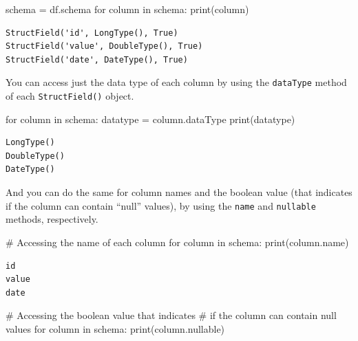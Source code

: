 \documentclass[
  11pt,
  letterpaper,
  DIV=11,
  numbers=noendperiod]{scrreprt}
\newenvironment{Shaded}{\begin{snugshade}}{\end{snugshade}}
\newcommand{\BuiltInTok}[1]{\textcolor[rgb]{0.00,0.23,0.31}{#1}}
\newcommand{\CommentTok}[1]{\textcolor[rgb]{0.37,0.37,0.37}{#1}}
\newcommand{\ControlFlowTok}[1]{\textcolor[rgb]{0.00,0.23,0.31}{#1}}
\newcommand{\KeywordTok}[1]{\textcolor[rgb]{0.00,0.23,0.31}{#1}}
\newcommand{\NormalTok}[1]{\textcolor[rgb]{0.00,0.23,0.31}{#1}}
\newcommand{\OperatorTok}[1]{\textcolor[rgb]{0.37,0.37,0.37}{#1}}
\begin{document}
\begin{Shaded}
\begin{Highlighting}[]
\NormalTok{schema }\OperatorTok{=}\NormalTok{ df.schema}
\ControlFlowTok{for}\NormalTok{ column }\KeywordTok{in}\NormalTok{ schema:}
  \BuiltInTok{print}\NormalTok{(column)}
\end{Highlighting}
\end{Shaded}

\begin{verbatim}
StructField('id', LongType(), True)
StructField('value', DoubleType(), True)
StructField('date', DateType(), True)
\end{verbatim}

You can access just the data type of each column by using the
\texttt{dataType} method of each \texttt{StructField()} object.

\begin{Shaded}
\begin{Highlighting}[]
\ControlFlowTok{for}\NormalTok{ column }\KeywordTok{in}\NormalTok{ schema:}
\NormalTok{  datatype }\OperatorTok{=}\NormalTok{ column.dataType}
  \BuiltInTok{print}\NormalTok{(datatype)}
\end{Highlighting}
\end{Shaded}

\begin{verbatim}
LongType()
DoubleType()
DateType()
\end{verbatim}

And you can do the same for column names and the boolean value (that
indicates if the column can contain ``null'' values), by using the
\texttt{name} and \texttt{nullable} methods, respectively.

\begin{Shaded}
\begin{Highlighting}[]
\CommentTok{\# Accessing the name of each column}
\ControlFlowTok{for}\NormalTok{ column }\KeywordTok{in}\NormalTok{ schema:}
  \BuiltInTok{print}\NormalTok{(column.name)}
\end{Highlighting}
\end{Shaded}

\begin{verbatim}
id
value
date
\end{verbatim}

\begin{Shaded}
\begin{Highlighting}[]
\CommentTok{\# Accessing the boolean value that indicates}
\CommentTok{\# if the column can contain null values}
\ControlFlowTok{for}\NormalTok{ column }\KeywordTok{in}\NormalTok{ schema:}
  \BuiltInTok{print}\NormalTok{(column.nullable)}
\end{Highlighting}
\end{Shaded}
\end{document}
